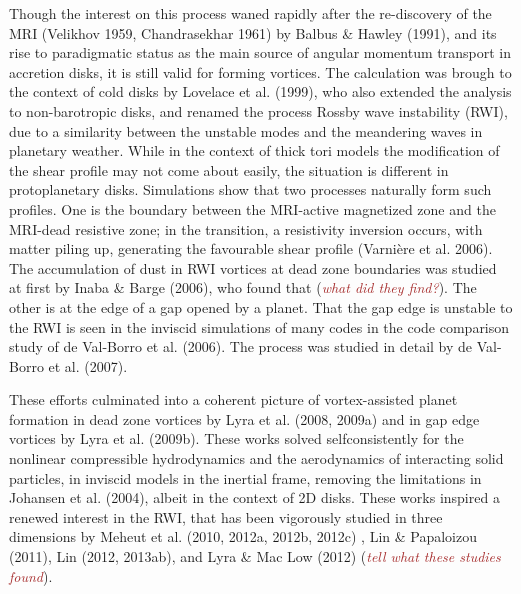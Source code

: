 \documentclass[apj]{emulateapj}
\def\brown#1{\textcolor{brown}{#1}}
\newcommand{\comm}[1]{({\it \brown{#1}})}
\begin{document}
Though the interest on this process waned rapidly after the re-discovery of the MRI
(Velikhov 1959, Chandrasekhar 1961) by Balbus \& Hawley (1991), and
its rise to paradigmatic status as the main source of angular momentum
transport in accretion disks, it is still valid for forming
vortices. The calculation was brough to the context of cold disks by
Lovelace et al. (1999), who also extended the analysis to
non-barotropic disks, and renamed the process Rossby wave instability
(RWI), due to a similarity between the unstable modes and the
meandering waves in planetary weather. While in the context of thick
tori models the modification of the shear profile may not come about
easily, the situation is different in protoplanetary
disks. Simulations show that two processes naturally form such
profiles. One is the boundary between the MRI-active magnetized zone
and the MRI-dead resistive zone; in the transition, a resistivity
inversion occurs, with matter piling up, generating the favourable
shear profile (Varni\`ere et al. 2006). The accumulation of dust in RWI vortices at dead zone boundaries was
studied at first by Inaba \& Barge (2006), who found that \comm{what
  did they find?}. The other is at the edge of a
gap opened by a planet. That the gap edge is unstable to the RWI is seen in
the inviscid simulations of many codes in the code comparison study of
de Val-Borro et al. (2006). The process was studied in detail by de
Val-Borro et al. (2007). 

These efforts culminated into a coherent picture of vortex-assisted
planet formation in dead zone vortices by Lyra et al. (2008, 2009a) and in 
gap edge vortices by Lyra et al. (2009b). These works solved
selfconsistently for the nonlinear compressible hydrodynamics and the
aerodynamics of interacting solid particles, in inviscid models in the
inertial frame, removing the limitations in Johansen et al. (2004),
albeit in the context of 2D disks. These works inspired a renewed
interest in the RWI, that has been vigorously studied in three
dimensions by Meheut et al. (2010, 2012a, 2012b, 2012c) , Lin \&
Papaloizou (2011),  Lin (2012, 2013ab), and Lyra \& Mac Low (2012)
\comm{tell what these studies found}. 
\end{document}
